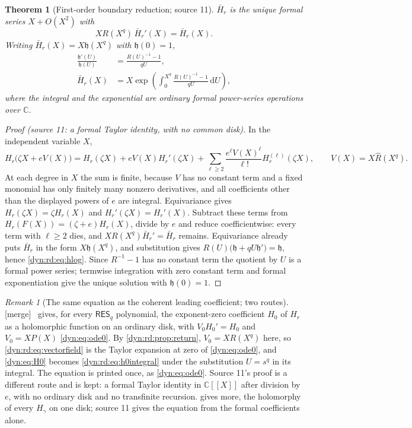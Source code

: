 \documentclass[11pt,letterpaper]{article}
\newtheorem{theorem}{Theorem}[section]
\theoremstyle{definition}
\theoremstyle{remark}
\newtheorem{remark}[remark]{Remark}
\newcommand{\C}{\mathbb C}
\newcommand{\dd}{\,\mathrm d}
\newcommand{\resq}{\mathsf{RES}_q}
\newcommand{\mergetag}{\textup{\textsf{\small[merge]}}}%
\numberwithin{equation}{section}
\begin{document}
\begin{theorem}[First-order boundary reduction; source 11]
\label{dyn:rd:thm:reduction}
$\bar H_r$ is the unique formal series $X+O(X^{2})$ with
\begin{equation}\label{dyn:rd:eq:vectorfield}
 XR(X^{q})\,\bar H_r'(X)=\bar H_r(X).
\end{equation}
Writing $\bar H_r(X)=X\mathfrak h(X^{q})$ with $\mathfrak h(0)=1$,
\begin{align}
 \frac{\mathfrak h'(U)}{\mathfrak h(U)}&=\frac{R(U)^{-1}-1}{qU},
 \label{dyn:rd:eq:hlog}\\
 \bar H_r(X)&=X\exp\left(\int_0^{X^{q}}\frac{R(U)^{-1}-1}{qU}\dd U\right),
 \label{dyn:rd:eq:h0integral}
\end{align}
where the integral and the exponential are ordinary formal power-series
operations over $\C$.
\end{theorem}
\begin{proof}[Proof \textup{(source 11: a formal Taylor identity, with no
common disk)}]
In the independent variable $X$,
\[
 H_r\bigl(\zeta X+eV(X)\bigr)=H_r(\zeta X)+eV(X)H_r'(\zeta X)
 +\sum_{\ell\ge2}\frac{e^{\ell}V(X)^{\ell}}{\ell!}H_r^{(\ell)}(\zeta X),
 \qquad V(X)=X\widehat R(X^{q}).
\]
At each degree in $X$ the sum is finite, because $V$ has no constant term
and a fixed monomial has only finitely many nonzero derivatives, and all
coefficients other than the displayed powers of $e$ are integral.
Equivariance gives $H_r(\zeta X)=\zeta H_r(X)$ and $H_r'(\zeta X)=H_r'(X)$.
Subtract these terms from $H_r(F(X))=(\zeta+e)H_r(X)$, divide by $e$ and
reduce coefficientwise: every term with $\ell\ge2$ dies, and
$XR(X^{q})\bar H_r'=\bar H_r$ remains. Equivariance already puts
$\bar H_r$ in the form $X\mathfrak h(X^{q})$, and substitution gives
$R(U)\bigl(\mathfrak h+qU\mathfrak h'\bigr)=\mathfrak h$, hence
\eqref{dyn:rd:eq:hlog}. Since $R^{-1}-1$ has no constant term the quotient
by $U$ is a formal power series; termwise integration with zero constant
term and formal exponentiation give the unique solution with
$\mathfrak h(0)=1$.
\end{proof}

\begin{remark}[The same equation as the coherent leading coefficient; two
routes]\label{dyn:rd:rem:coherent}
\mergetag\  gives, for every $\resq$ polynomial, the
exponent-zero coefficient $H_0$ of $H_r$ as a holomorphic function on an
ordinary disk, with $V_0H_0'=H_0$ and $V_0=XP(X)$ \eqref{dyn:eq:ode0}. By
\cref{dyn:rd:prop:return}, $V_0=XR(X^{q})$ here, so
\eqref{dyn:rd:eq:vectorfield} is the Taylor expansion at zero of
\eqref{dyn:eq:ode0}, and \eqref{dyn:eq:H0} becomes
\eqref{dyn:rd:eq:h0integral} under the substitution $U=s^{q}$ in its
integral. The equation is printed once, as \eqref{dyn:eq:ode0}. Source 11's
proof is a different route and is kept: a formal Taylor identity in
$\C[[X]]$ after division by $e$, with no ordinary disk and no transfinite
recursion.  gives more, the holomorphy of every
$H_\gamma$ on one disk; source 11 gives the equation from the formal
coefficients alone.
\end{remark}
\end{document}
